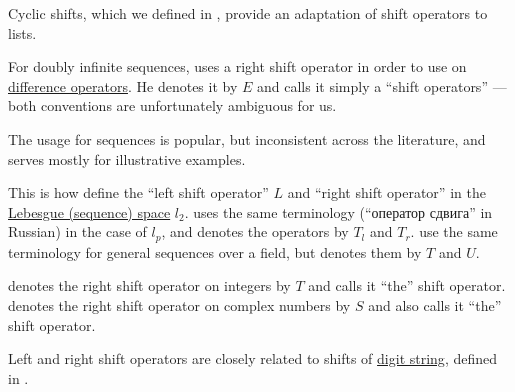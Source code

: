\begin{comments}
  \item Cyclic shifts, which we defined in , provide an adaptation of shift operators to lists.

  \item For doubly infinite sequences,  uses a right shift operator in order to use  on \hyperref[def:finite_difference_operator]{difference operators}. He denotes it by \( E \) and calls it simply a \enquote{shift operators} --- both conventions are unfortunately ambiguous for us.

  The usage for sequences is popular, but inconsistent across the literature, and serves mostly for illustrative examples.

  This is how  define the \enquote{left shift operator} \( L \) and \enquote{right shift operator} in the \hyperref[def:lebesgue_space]{Lebesgue (sequence) space} \( l_2 \).  uses the same terminology (\enquote{оператор сдвига} in Russian) in the case of \( l_p \), and denotes the operators by \( T_l \) and \( T_r \).  use the same terminology for general sequences over a field, but denotes them by \( T \) and \( U \).

   denotes the right shift operator on integers by \( T \) and calls it \enquote{the} shift operator.  denotes the right shift operator on complex numbers by \( S \) and also calls it \enquote{the} shift operator.

  \item Left and right shift operators are closely related to shifts of \hyperref[def:positional_number_system]{digit string}, defined in .
\end{comments}

